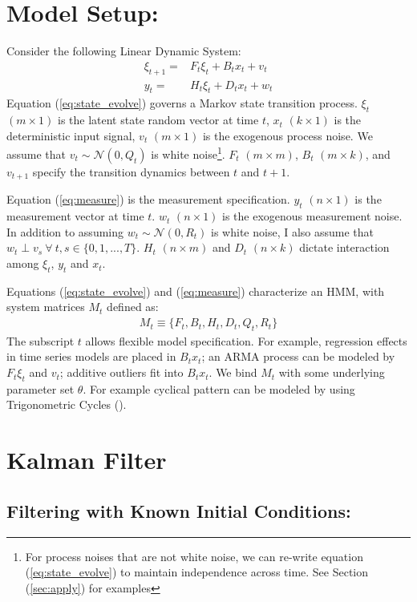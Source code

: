 \documentclass[12pt]{article}
\numberwithin{equation}{section}
\begin{document}
\section{Model Setup:} \label{sec:model_setup}
Consider the following Linear Dynamic System:
\begin{align}
    \xi_{t+1} = & F_{t}\xi_{t} + B_{t}x_t + v_t \label{eq:state_evolve} \\
    y_t = & H_t\xi_{t} + D_{t}x_t + w_t \label{eq:measure}
\end{align}
Equation (\ref{eq:state_evolve}) governs a Markov state transition process. $\xi_t$ $(m\times 1)$ is the latent state random vector at time $t$, $x_t$ $(k\times 1)$ is the deterministic input signal, $v_t$ $(m\times 1)$ is the exogenous process noise. We assume that $v_t\sim \mathcal{N}(0,Q_t)$ is white noise\footnote{For process noises that are not white noise, we can re-write equation (\ref{eq:state_evolve}) to maintain independence across time. See Section (\ref{sec:apply}) for examples}. $F_t$ $(m\times m)$, $B_t$ $(m\times k)$, and $v_{t+1}$ specify the transition dynamics between $t$ and $t+1$. 

Equation (\ref{eq:measure}) is the measurement specification. $y_t$ $(n\times 1)$ is the measurement vector at time $t$. $w_t$ $(n\times 1)$ is the exogenous measurement noise. In addition to assuming $w_t\sim \mathcal{N}(0, R_t)$ is white noise, I also assume that  $w_t \perp v_s \ \forall\  t,s\in\{0,1,...,T\}$. $H_t$ $(n\times m)$ and $D_t$ $(n\times k)$ dictate interaction among $\xi_t$, $y_t$ and $x_t$. 

Equations (\ref{eq:state_evolve}) and (\ref{eq:measure}) characterize an HMM, with system matrices $M_t$ defined as:
\begin{align*}
M_t\equiv\{F_t, B_t, H_t, D_t, Q_t, R_t\}
\end{align*}
The subscript $t$ allows flexible model specification. For example, regression effects in time series models are placed in $B_t x_t$; an ARMA process can be modeled by $F_t\xi_t$ and $v_t$; additive outliers fit into $B_t x_t$. We bind $M_t$ with some underlying parameter set $\theta$. For example cyclical pattern can be modeled by using Trigonometric Cycles (\cite{harvey_1985}).  

\section{Kalman Filter} \label{sec:filter}
\subsection{Filtering with Known Initial Conditions:}
\end{document}
